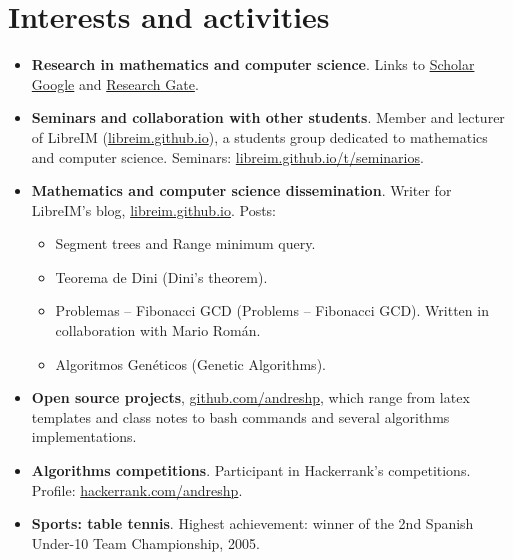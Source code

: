 \documentclass[10pt,a4paper,sans]{moderncv} %
\begin{document}
\section{Interests and activities}
\begin{itemize}
    \item \textbf{Research in mathematics and computer science}. Links to \textcolor{colorl}{\href{https://scholar.google.es/citations?user=oLAt2JsAAAAJ&hl=es}{Scholar Google}} and \textcolor{colorl}{\href{https://www.researchgate.net/profile/Andres_Herrera-Poyatos}{Research Gate}}.
    \item \textbf{Seminars and collaboration with other students}. Member and lecturer of LibreIM (\textcolor{colorl}{\url{libreim.github.io}}), a students group dedicated to mathematics and computer science.
      Seminars: \textcolor{colorl}{\url{libreim.github.io/t/seminarios}}.
    \item \textbf{Mathematics and computer science dissemination}. Writer for LibreIM's blog, \textcolor{colorl}{\url{libreim.github.io}}. Posts:
    	\begin{itemize}
    		\item Segment trees and Range minimum query.
    		\item Teorema de Dini (Dini's theorem).
    		\item Problemas -- Fibonacci GCD (Problems -- Fibonacci GCD). Written in collaboration with Mario Román.
    		\item Algoritmos Genéticos (Genetic Algorithms).
    	\end{itemize}
    \item \textbf{Open source projects}, \textcolor{colorl}{\url{github.com/andreshp}}, which range from latex templates and class notes to bash commands and several algorithms implementations.
    \item \textbf{Algorithms competitions}. Participant in Hackerrank's competitions. Profile: \textcolor{colorl}{\url{hackerrank.com/andreshp}}.
    \item \textbf{Sports: table tennis}. Highest achievement: winner of the 2nd Spanish Under-10 Team Championship, 2005.
\end{itemize}
\end{document}
